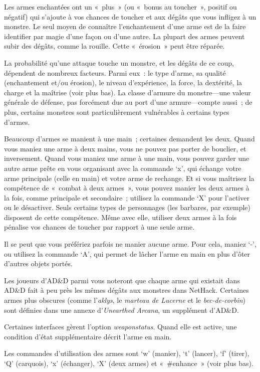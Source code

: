 \documentclass[titlepage]{article}
\begin{document}
Les armes enchantées ont un «~plus~» (ou «~bonus au
toucher~», positif ou négatif) qui s'ajoute à vos chances de toucher et
aux dégâts que vous infligez à un monstre.
Le seul moyen de connaître l'enchantement d'une arme est de la faire
identifier par magie d'une façon ou d'une autre.
La plupart des armes peuvent subir des dégâts, comme la rouille.
Cette «~érosion~» peut être réparée.


La probabilité qu'une attaque touche un monstre, et les dégâts de ce coup,
dépendent de nombreux facteurs.
Parmi eux~: le type d'arme, sa qualité (enchantement et/ou érosion), le
niveau d'expérience, la force, la dextérité, la charge et la maîtrise
(voir plus bas).
La classe d'armure du monstre---une valeur générale de défense, pas
forcément due au port d'une armure---compte aussi~; de plus, certains
monstres sont particulièrement vulnérables à certains types d'armes.


Beaucoup d'armes se manient à une main~; certaines demandent les deux.
Quand vous maniez une arme à deux mains, vous ne pouvez pas porter de
bouclier, et inversement.
Quand vous maniez une arme à une main, vous pouvez garder une autre arme
prête en vous organisant avec la commande `x', qui échange votre arme
principale (celle en main) et votre arme de rechange.
Et si vous maîtrisez la compétence de «~combat à deux armes~», vous
pouvez manier les deux armes à la fois, comme principale et secondaire~;
utilisez la commande `X' pour l'activer ou le désactiver.
Seuls certains types de personnages (les barbares, par exemple) disposent
de cette compétence.
Même avec elle, utiliser deux armes à la fois pénalise vos chances de
toucher par rapport à une seule arme.


Il se peut que vous préfériez parfois ne manier aucune arme.
Pour cela, maniez `-', ou utilisez la commande `A', qui permet
de lâcher l'arme en main en plus d'ôter d'autres objets portés.


Les joueurs d'AD\&D parmi vous noteront que chaque arme qui existait dans
AD\&D fait à peu près les mêmes dégâts aux monstres dans NetHack.
Certaines armes plus obscures (comme l'\textit{aklys}, le \textit{marteau de
Lucerne} et le \textit{bec-de-corbin}) sont définies dans une annexe
d'\textit{Unearthed Arcana}, un supplément d'AD\&D.


Certaines interfaces gèrent l'option
\textit{weaponstatus}.
Quand elle est active, une condition d'état supplémentaire décrit l'arme
en main.


Les commandes d'utilisation des armes sont `w' (manier), `t'
(lancer), `f' (tirer), `Q' (carquois), `x' (échanger),
`X' (deux armes) et «~\#enhance~» (voir plus bas).
\end{document}
